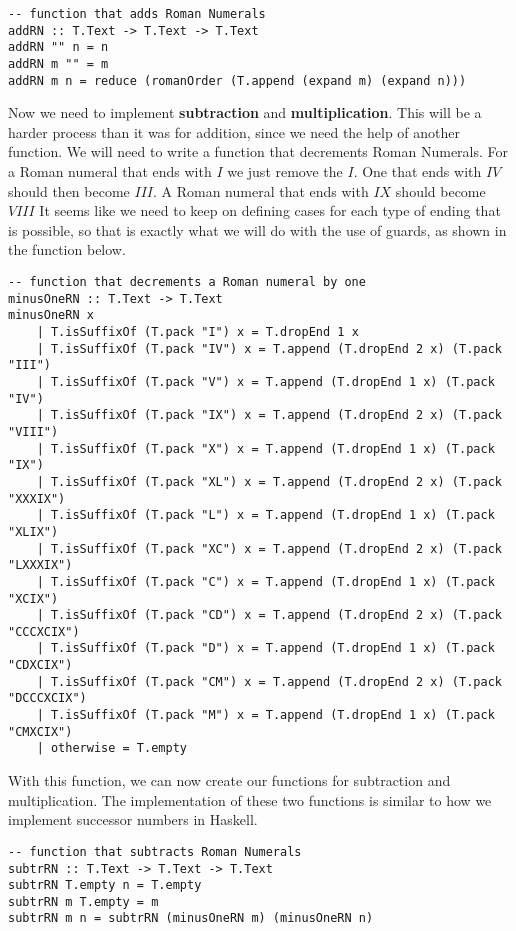 \documentclass{article}
\begin{document}
\begin{lstlisting}
-- function that adds Roman Numerals
addRN :: T.Text -> T.Text -> T.Text
addRN "" n = n
addRN m "" = m
addRN m n = reduce (romanOrder (T.append (expand m) (expand n)))
\end{lstlisting}

Now we need to implement \textbf{subtraction} and \textbf{multiplication}. This will be a harder process than it was for addition, since we need the help of another function. We will need to write a function that decrements Roman Numerals. For a Roman numeral that ends with $I$ we just remove the $I$. One that ends with $IV$ should then become $III$. A Roman numeral that ends with $IX$ should become $VIII$ It seems like we need to keep on defining cases for each type of ending that is possible, so that is exactly what we will do with the use of guards, as shown in the function below.

\begin{lstlisting}
-- function that decrements a Roman numeral by one
minusOneRN :: T.Text -> T.Text
minusOneRN x
    | T.isSuffixOf (T.pack "I") x = T.dropEnd 1 x
    | T.isSuffixOf (T.pack "IV") x = T.append (T.dropEnd 2 x) (T.pack "III")
    | T.isSuffixOf (T.pack "V") x = T.append (T.dropEnd 1 x) (T.pack "IV")
    | T.isSuffixOf (T.pack "IX") x = T.append (T.dropEnd 2 x) (T.pack "VIII")
    | T.isSuffixOf (T.pack "X") x = T.append (T.dropEnd 1 x) (T.pack "IX")
    | T.isSuffixOf (T.pack "XL") x = T.append (T.dropEnd 2 x) (T.pack "XXXIX")
    | T.isSuffixOf (T.pack "L") x = T.append (T.dropEnd 1 x) (T.pack "XLIX")
    | T.isSuffixOf (T.pack "XC") x = T.append (T.dropEnd 2 x) (T.pack "LXXXIX")
    | T.isSuffixOf (T.pack "C") x = T.append (T.dropEnd 1 x) (T.pack "XCIX")
    | T.isSuffixOf (T.pack "CD") x = T.append (T.dropEnd 2 x) (T.pack "CCCXCIX")
    | T.isSuffixOf (T.pack "D") x = T.append (T.dropEnd 1 x) (T.pack "CDXCIX")
    | T.isSuffixOf (T.pack "CM") x = T.append (T.dropEnd 2 x) (T.pack "DCCCXCIX")
    | T.isSuffixOf (T.pack "M") x = T.append (T.dropEnd 1 x) (T.pack "CMXCIX")
    | otherwise = T.empty
\end{lstlisting}

With this function, we can now create our functions for subtraction and multiplication. The implementation of these two functions is similar to how we implement successor numbers in Haskell.

\begin{lstlisting}
-- function that subtracts Roman Numerals
subtrRN :: T.Text -> T.Text -> T.Text
subtrRN T.empty n = T.empty
subtrRN m T.empty = m
subtrRN m n = subtrRN (minusOneRN m) (minusOneRN n)
\end{lstlisting}
\end{document}
